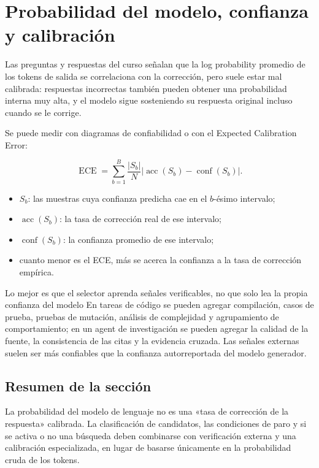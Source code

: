 \section{Probabilidad del modelo, confianza y calibración}

Las preguntas y respuestas del curso señalan que la log probability promedio de los tokens de salida se correlaciona con la corrección, pero suele estar mal calibrada: respuestas incorrectas también pueden obtener una probabilidad interna muy alta, y el modelo sigue sosteniendo su respuesta original incluso cuando se le corrige.

Se puede medir con diagramas de confiabilidad o con el Expected Calibration Error:

$$
\operatorname{ECE}=\sum_{b=1}^{B}\frac{|S_b|}{N}
\left|\operatorname{acc}(S_b)-\operatorname{conf}(S_b)\right|.
$$

\begin{itemize}
    \item $S_b$: las muestras cuya confianza predicha cae en el $b$-ésimo intervalo;
    \item $\operatorname{acc}(S_b)$: la tasa de corrección real de ese intervalo;
    \item $\operatorname{conf}(S_b)$: la confianza promedio de ese intervalo;
    \item cuanto menor es el ECE, más se acerca la confianza a la tasa de corrección empírica.
\end{itemize}

\begin{knowledgebox}{Lo mejor es que el selector aprenda señales verificables, no que solo lea la propia confianza del modelo}
En tareas de código se pueden agregar compilación, casos de prueba, pruebas de mutación, análisis de complejidad y agrupamiento de comportamiento; en un agent de investigación se pueden agregar la calidad de la fuente, la consistencia de las citas y la evidencia cruzada. Las señales externas suelen ser más confiables que la confianza autorreportada del modelo generador.
\end{knowledgebox}

\subsection{Resumen de la sección}

La probabilidad del modelo de lenguaje no es una «tasa de corrección de la respuesta» calibrada. La clasificación de candidatos, las condiciones de paro y si se activa o no una búsqueda deben combinarse con verificación externa y una calibración especializada, en lugar de basarse únicamente en la probabilidad cruda de los tokens.

